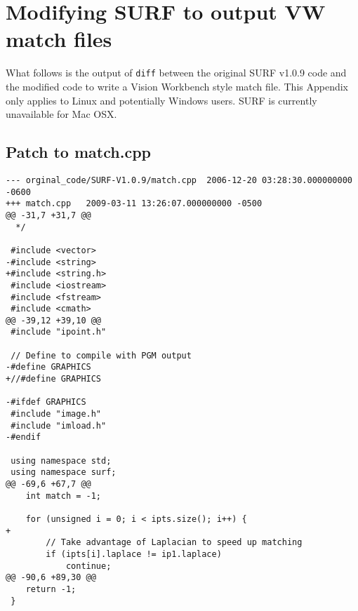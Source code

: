 \chapter{Modifying SURF to output VW match files}
\label{appendix_surf}

What follows is the output of \texttt{diff} between the original SURF
v1.0.9 code and the modified code to write a Vision Workbench style
match file. This Appendix only applies to Linux and potentially
Windows users. SURF is currently unavailable for Mac OSX.

\section{Patch to match.cpp}

\begin{verbatim}
--- orginal_code/SURF-V1.0.9/match.cpp	2006-12-20 03:28:30.000000000 -0600
+++ match.cpp	2009-03-11 13:26:07.000000000 -0500
@@ -31,7 +31,7 @@
  */
 
 #include <vector>
-#include <string>
+#include <string.h>
 #include <iostream>
 #include <fstream>
 #include <cmath>
@@ -39,12 +39,10 @@
 #include "ipoint.h"
 
 // Define to compile with PGM output
-#define GRAPHICS
+//#define GRAPHICS
 
-#ifdef GRAPHICS
 #include "image.h"
 #include "imload.h"
-#endif
 
 using namespace std;
 using namespace surf;
@@ -69,6 +67,7 @@
 	int match = -1;
 
 	for (unsigned i = 0; i < ipts.size(); i++) {
+
 		// Take advantage of Laplacian to speed up matching
 		if (ipts[i].laplace != ip1.laplace)
 			continue;
@@ -90,6 +89,30 @@
 	return -1;
 }
 

\end{verbatim}
